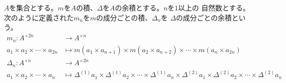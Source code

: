 	\begin{definition}[成分ごとの積と余積]\label{def:成分ごとの積と余積} %
		$A$を集合とする。$m$を$A$の積、$\Delta$を$A$の余積とする。$n$を$1$以上の
		自然数とする。次のように定義された$m_n$を$m$の成分ごとの積、$\Delta_n$を
		$\Delta$の成分ごとの余積という。
		\begin{equation}\begin{split} %
			m_n: A^{\times 2n} &\to A^{\times n} \\
				a_1\times a_2\times \cdots\times a_{2n} &\mapsto m(a_1\times a_{n+1})\times m(a_2\times a_{n+2})\times \cdots\times m(a_n\times a_{2n}) \\
			\Delta_n: A^{\times n} &\to A^{\times 2n} \\
				a_1\times a_2\times \cdots\times a_n &\mapsto \Delta^{(1)}a_1\times \Delta^{(1)}a_2\times \cdots\times \Delta^{(1)}a_n\times \Delta^{(2)}a_1\times \Delta^{(2)}a_2\times \cdots\times \Delta^{(2)}a_n \\
		\end{split}\end{equation} %
	\end{definition} %

